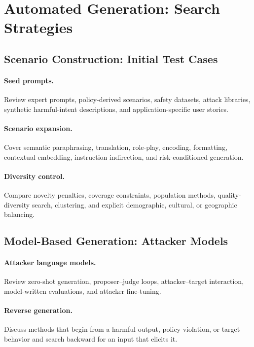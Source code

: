 \section{Automated Generation: Search Strategies}
\label{sec:generation}

\subsection{Scenario Construction: Initial Test Cases}

\paragraph{Seed prompts.}
Review expert prompts, policy-derived scenarios, safety datasets, attack libraries, synthetic harmful-intent descriptions, and application-specific user stories.

\paragraph{Scenario expansion.}
Cover semantic paraphrasing, translation, role-play, encoding, formatting, contextual embedding, instruction indirection, and risk-conditioned generation.

\paragraph{Diversity control.}
Compare novelty penalties, coverage constraints, population methods, quality-diversity search, clustering, and explicit demographic, cultural, or geographic balancing.

\subsection{Model-Based Generation: Attacker Models}

\paragraph{Attacker language models.}
Review zero-shot generation, proposer--judge loops, attacker--target interaction, model-written evaluations, and attacker fine-tuning.

\paragraph{Reverse generation.}
Discuss methods that begin from a harmful output, policy violation, or target behavior and search backward for an input that elicits it.

